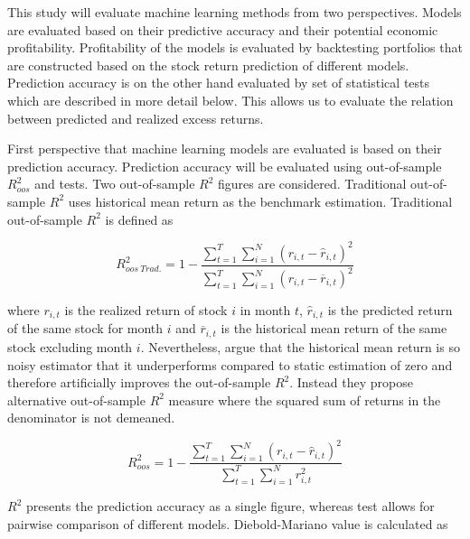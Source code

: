 \documentclass[12pt]{article}
\begin{document}
This study will evaluate machine learning methods from two perspectives. Models are evaluated based on their predictive accuracy and their potential economic profitability. Profitability of the models is evaluated by backtesting portfolios that are constructed based on the stock return prediction of different models. Prediction accuracy is on the other hand evaluated by set of statistical tests which are described in more detail below. This allows us to evaluate the relation between predicted and realized excess returns. \par

First perspective that machine learning models are evaluated is  based on their prediction accuracy. Prediction accuracy will be evaluated using out-of-sample $R^{2}_{oos}$ and \citet{Diebold1995} tests. Two out-of-sample $R^{2}$ figures are considered. Traditional out-of-sample $R^{2}$ uses historical mean  return as the benchmark estimation. Traditional out-of-sample $R^{2}$ is defined as \par

\begin{equation}
\label{eq:r2Trad}
R^{2}_{oos \ Trad.} = 1 - \frac{\sum^T_{t=1} \sum^N_{i=1} (r_{i, t} - \hat r_{i, t})^2}{ \sum^T_{t=1} \sum^N_{i=1} (r_{i, t} - \overline{r}_{i, t} )^2}
\end{equation}

where $r_{i, t}$ is the realized return of stock $i$ in month $t$, $\hat r_{i, t}$ is the predicted return of the same stock for month $i$ and $\overline{r}_{i, t}$ is the historical mean return of the same stock excluding month $i$. Nevertheless, \citet{guetal} argue that the historical mean return is so noisy estimator that it underperforms compared to static estimation of zero and therefore artificially improves the out-of-sample $R^{2}$. Instead they propose alternative out-of-sample $R^{2}$ measure where the squared sum of returns in the denominator is not demeaned. \par

\begin{equation}
\label{eq:r2}
R^{2}_{oos} = 1 - \frac{\sum^T_{t=1} \sum^N_{i=1} (r_{i, t} - \hat r_{i, t})^2}{ \sum^T_{t=1} \sum^N_{i=1} r^2_{i, t}}
\end{equation}

$R^2$ presents the prediction accuracy as a single figure, whereas \citet{Diebold1995} test allows for pairwise comparison of different models. Diebold-Mariano value is calculated as \par
\end{document}
